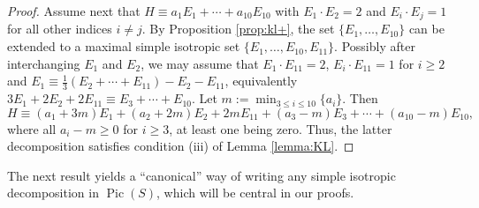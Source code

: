 \documentclass[11pt]{amsart}
\theoremstyle{definition}
\def\min{\operatorname{min}}
\def\Pic{\operatorname{Pic}}
\renewcommand{\leq}{\leqslant}
\renewcommand{\geq}{\geqslant}
\begin{document}
\begin{proof}
Assume next that $H \equiv a_1E_1+\cdots+a_{10}E_{10}$ with $E_1 \cdot E_2=2$ and $E_i \cdot E_j=1$ for all other indices
  $i \neq j$. By Proposition \ref{prop:kl+}, the set $\{E_1,\ldots,E_{10}\}$ can be extended to a maximal simple isotropic set $\{E_1,\ldots,E_{10},E_{11}\}$.
Possibly after interchanging $E_1$ and $E_2$, we may assume that $E_1 \cdot E_{11}=2$, $E_i \cdot E_{11}=1$ for $i \geq 2$ and 
$E_1 \equiv \frac{1}{3}(E_2+\cdots+E_{11})-E_2-E_{11}$, equivalently
  $3E_1+2E_2+2E_{11} \equiv E_3+\cdots+E_{10}$.
Let $m:=\min_{3 \leq i \leq 10}\{a_i\}$. Then 
\[ H \equiv (a_1+3m)E_1+(a_2+2m)E_2+2mE_{11} + (a_3-m)E_3+\cdots+(a_{10}-m)E_{10},\] where all $a_i-m \geq 0$ for $i \geq 3$, at  least one being zero. Thus, the latter decomposition satisfies condition (iii) of Lemma \ref{lemma:KL}.
\end{proof}


The next result yields a ``canonical'' way of writing any simple isotropic decomposition in $\Pic(S)$, which will be central in our proofs.
\end{document}
